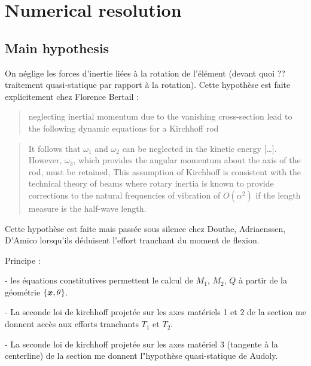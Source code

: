 \section{Numerical resolution}

\subsection{Main hypothesis}

On néglige les forces d'inertie liées à la rotation de l'élément  (devant quoi ?? traitement quasi-statique par rapport à la rotation). Cette hypothèse est faite explicitement chez Florence Bertail :

\blockcquote[]{Casati2013}{neglecting inertial momentum due to the vanishing cross-section lead to the following dynamic equations for a Kirchhoff rod}
\blockcquote[p. 17]{Dill1992}{It follows that $\omega_1$ and $\omega_2$ can be neglected in the kinetic energy [\ldots]. However, $\omega_3$, which provides the angular momentum about the axis of the rod, must be retained, This assumption of Kirchhoff is consistent with the technical theory of beams where rotary inertia is known to provide corrections to the natural frequencies of vibration of $O(\alpha^2)$ if the length measure is the half-wave length.}


Cette hypothèse est faite mais passée sous silence chez Douthe, Adriaenssen, D'Amico lorsqu'ils déduisent l'effort tranchant du moment de flexion.

Principe :

- les équations constitutives permettent le calcul de $M_1$, $M_2$, $Q$ à partir de la géométrie $\{\boldsymbol{x},\theta\}$.

- La seconde loi de kirchhoff projetée sur les axes matériels 1 et 2 de la section me donnent accès aux efforts tranchants $T_1$ et $T_2$.

- La seconde loi de kirchhoff projetée sur les axes matériel 3 (tangente à la centerline) de la section me donnent l"hypothèse quasi-statique de Audoly.



